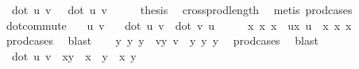 \begin{isabellebody}
\ \ {\isacharparenleft}{\kern0pt}dot\ u\ v{\isacharparenright}{\kern0pt}\ {\isacharasterisk}{\kern0pt}\ \ {\isacharparenleft}{\kern0pt}dot\ u\ v{\isacharparenright}{\kern0pt}{\isachardoublequoteclose}\isanewline
%
\isadelimproof
%
\endisadelimproof
%
\isatagproof
{}\isamarkupfalse%
\ {\isacharminus}{\kern0pt}\isanewline
\ \ \isamarkupfalse%
\ {\isacharquery}{\kern0pt}thesis\ \isamarkupfalse%
\ cross{\isacharunderscore}{\kern0pt}prod{\isacharunderscore}{\kern0pt}length\ \isamarkupfalse%
\ {\isacharparenleft}{\kern0pt}metis\ prod{\isacharunderscore}{\kern0pt}cases{}{\isacharparenright}{\kern0pt}\isanewline
{}\isamarkupfalse%
%
\endisatagproof
{\isafoldproof}%
%
\isadelimproof
\isanewline
%
\endisadelimproof
\isanewline
{}\isamarkupfalse%
\ dot{\isacharunderscore}{\kern0pt}commute{\isacharcolon}{\kern0pt}\isanewline
\ \ \ u\ v\isanewline
\ \ \ {\isachardoublequoteopen}dot\ u\ v\ {\isacharequal}{\kern0pt}\ dot\ v\ u{\isachardoublequoteclose}\isanewline
%
\isadelimproof
%
\endisadelimproof
%
\isatagproof
{}\isamarkupfalse%
\ {\isacharminus}{\kern0pt}\isanewline
\ \ \isamarkupfalse%
\ x{}\ x{}\ x{}\ \ ux{\isacharcolon}{\kern0pt}\ {\isachardoublequoteopen}u\ {\isacharequal}{\kern0pt}\ {\isacharparenleft}{\kern0pt}x{}{\isacharcomma}{\kern0pt}\ x{}{\isacharcomma}{\kern0pt}\ x{}{\isacharparenright}{\kern0pt}{\isachardoublequoteclose}\ \isamarkupfalse%
\ prod{\isacharunderscore}{\kern0pt}cases{}\ \isamarkupfalse%
\ blast\isanewline
\ \ \isamarkupfalse%
\ y{}\ y{}\ y{}\ \ vy{\isacharcolon}{\kern0pt}\ {\isachardoublequoteopen}v\ {\isacharequal}{\kern0pt}\ {\isacharparenleft}{\kern0pt}y{}{\isacharcomma}{\kern0pt}\ y{}{\isacharcomma}{\kern0pt}\ y{}{\isacharparenright}{\kern0pt}{\isachardoublequoteclose}\ \isamarkupfalse%
\ prod{\isacharunderscore}{\kern0pt}cases{}\ \isamarkupfalse%
\ blast\isanewline
\ \ \isamarkupfalse%
\ {}{\isacharcolon}{\kern0pt}\ {\isachardoublequoteopen}dot\ u\ v\ {\isacharequal}{\kern0pt}\ x{}{\isacharasterisk}{\kern0pt}y{}\ {\isacharplus}{\kern0pt}\ x{}\ {\isacharasterisk}{\kern0pt}\ y{}\ {\isacharplus}{\kern0pt}\ x{}\ {\isacharasterisk}{\kern0pt}y{}{\isachardoublequoteclose}\ \isamarkupfalse%

\end{isabellebody}
